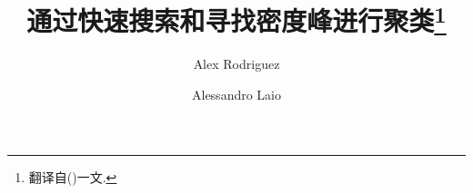 \documentclass[10pt, twocolumn]{ctexart}
\title{通过快速搜索和寻找密度峰进行聚类\footnote{翻译自\citeauthor{Rodriguez2014}(\citeyear{Rodriguez2014})一文. }}
\author{Alex Rodriguez \and Alessandro Laio}
\date{}
\begin{document}
    \begin{titlepage}
        \maketitle
        
    \end{titlepage}


    

    

    


    \appendix

    \printbibliography
\end{document}
